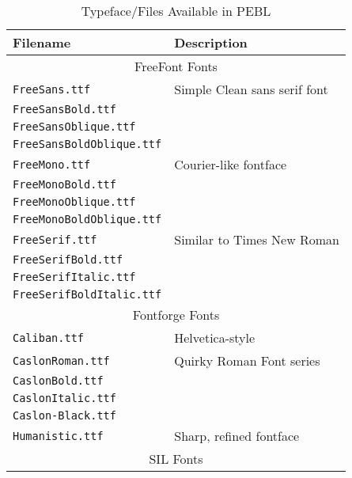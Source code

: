 \begin{table}[htbp]
\small
\caption{Typeface/Files Available in PEBL}
\begin{tabular}{ll}
\toprule
\textbf{Filename}&\textbf{Description}\\
\midrule
\multicolumn{2}{c}{FreeFont Fonts}\\
\texttt{FreeSans.ttf} &Simple Clean sans serif font\\
\texttt{FreeSansBold.ttf}& \\
\texttt{FreeSansOblique.ttf}&\\
\texttt{FreeSansBoldOblique.ttf}&\\
\texttt{FreeMono.ttf}& Courier-like fontface\\
\texttt{FreeMonoBold.ttf}& \\
\texttt{FreeMonoOblique.ttf}& \\
\texttt{FreeMonoBoldOblique.ttf}& \\
\texttt{FreeSerif.ttf}& Similar to Times New Roman\\
\texttt{FreeSerifBold.ttf}& \\
\texttt{FreeSerifItalic.ttf}&\\
\texttt{FreeSerifBoldItalic.ttf}& \\
\midrule
\multicolumn{2}{c}{Fontforge Fonts}\\
\texttt{Caliban.ttf}&  Helvetica-style  \\
\texttt{CaslonRoman.ttf}& Quirky Roman Font series\\
\texttt{CaslonBold.ttf}&\\
\texttt{CaslonItalic.ttf}&\\
\texttt{Caslon-Black.ttf}&\\
\texttt{Humanistic.ttf}&Sharp, refined fontface\\
\midrule
\multicolumn{2}{c}{SIL Fonts}\\


\end{tabular}
\end{table}
